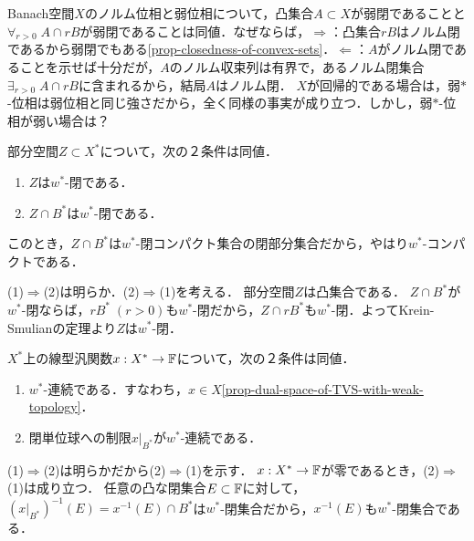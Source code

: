 \documentclass[uplatex,dvipdfmx]{jsreport}
\begin{document}
\begin{remarks}
    Banach空間$X$のノルム位相と弱位相について，凸集合$A\subset X$が弱閉であることと$\forall_{r>0}\;A\cap rB$が弱閉であることは同値．なぜならば，$\Rightarrow$：凸集合$rB$はノルム閉であるから弱閉でもある\ref{prop-closedness-of-convex-sets}．$\Leftarrow$：$A$がノルム閉であることを示せば十分だが，$A$のノルム収束列は有界で，あるノルム閉集合$\exists_{r>0}\;A\cap rB$に含まれるから，結局$A$はノルム閉．
    $X$が回帰的である場合は，弱$*$-位相は弱位相と同じ強さだから，全く同様の事実が成り立つ．しかし，弱$*$-位相が弱い場合は？
\end{remarks}

\begin{corollary}
    部分空間$Z\subset X^*$について，次の２条件は同値．
    \begin{enumerate}
        \item $Z$は$w^*$-閉である．
        \item $Z\cap B^*$は$w^*$-閉である．
    \end{enumerate}
    このとき，$Z\cap B^*$は$w^*$-閉コンパクト集合の閉部分集合だから，やはり$w^*$-コンパクトである．
\end{corollary}
\begin{Proof}
    (1)$\Rightarrow$(2)は明らか．(2)$\Rightarrow$(1)を考える．
    部分空間$Z$は凸集合である．
    $Z\cap B^*$が$w^*$-閉ならば，$rB^*\;(r>0)$も$w^*$-閉だから，$Z\cap rB^*$も$w^*$-閉．よってKrein-Smulianの定理より$Z$は$w^*$-閉．
\end{Proof}

\begin{corollary}\label{cor-characterization-of-weak-star-continuousness}
    $X^*$上の線型汎関数$x:X^*\to\mathbb{F}$について，次の２条件は同値．
    \begin{enumerate}
        \item $w^*$-連続である．すなわち，$x\in X$\ref{prop-dual-space-of-TVS-with-weak-topology}．
        \item 閉単位球への制限$x|_{B^*}$が$w^*$-連続である．
    \end{enumerate}
\end{corollary}
\begin{Proof}
    (1)$\Rightarrow$(2)は明らかだから(2)$\Rightarrow$(1)を示す．
    $x:X^*\to\mathbb{F}$が零であるとき，(2)$\Rightarrow$(1)は成り立つ．
    任意の凸な閉集合$E\subset\mathbb{F}$に対して，$(x|_{B^*})^{-1}(E)=x^{-1}(E)\cap B^*$は$w^*$-閉集合だから，$x^{-1}(E)$も$w^*$-閉集合である．
\end{Proof}
\end{document}
